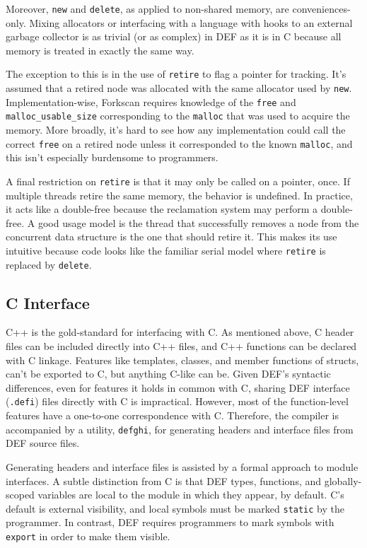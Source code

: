 Moreover, \texttt{new} and \texttt{delete}, as applied to non-shared memory, are conveniences-only.  Mixing allocators or interfacing with a language with hooks to an external garbage collector is as trivial (or as complex) in DEF as it is in C because all memory is treated in exactly the same way.

The exception to this is in the use of \texttt{retire} to flag a pointer for tracking.  It's assumed that a retired node was allocated with the same allocator used by \texttt{new}.  Implementation-wise, Forkscan requires knowledge of the \texttt{free} and \texttt{malloc\_{}usable\_{}size} corresponding to the \texttt{malloc} that was used to acquire the memory.  More broadly, it's hard to see how any implementation could call the correct \texttt{free} on a retired node unless it corresponded to the known \texttt{malloc}, and this isn't especially burdensome to programmers.

A final restriction on \texttt{retire} is that it may only be called on a pointer, once.  If multiple threads retire the same memory, the behavior is undefined.  In practice, it acts like a double-free because the reclamation system may perform a double-free.  A good usage model is the thread that successfully removes a node from the concurrent data structure is the one that should retire it.  This makes its use intuitive because code looks like the familiar serial model where \texttt{retire} is replaced by \texttt{delete}.


\subsection{C Interface}

C++ is the gold-standard for interfacing with C.  As mentioned above, C header files can be included directly into C++ files, and C++ functions can be declared with C linkage.  Features like templates, classes, and member functions of structs, can't be exported to C, but anything C-like can be.  Given DEF's syntactic differences, even for features it holds in common with C, sharing DEF interface (\texttt{.defi}) files directly with C is impractical.  However, most of the function-level features have a one-to-one correspondence with C.  Therefore, the compiler is accompanied by a utility, \texttt{defghi}, for generating headers and interface files from DEF source files.

Generating headers and interface files is assisted by a formal approach to module interfaces.  A subtle distinction from C is that DEF types, functions, and globally-scoped variables are local to the module in which they appear, by default.  C's default is external visibility, and local symbols must be marked \texttt{static} by the programmer.  In contrast, DEF requires programmers to mark symbols with \texttt{export} in order to make them visible.

